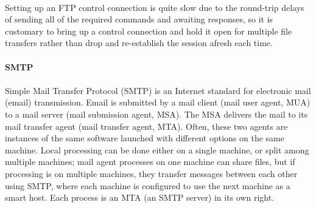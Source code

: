 \paragraph{}
Setting up an FTP control connection is quite slow due to the round-trip delays of sending all of the required commands and awaiting responses, so it is customary to bring up a control connection and hold it open for multiple file transfers rather than drop and re-establish the session afresh each time. 

\paragraph{} \textbf{SMTP}
\paragraph{}
Simple Mail Transfer Protocol (SMTP) is an Internet standard for electronic mail (email) transmission. Email is submitted by a mail client (mail user agent, MUA) to a mail server (mail submission agent, MSA). The MSA delivers the mail to its mail transfer agent (mail transfer agent, MTA). Often, these two agents are instances of the same software launched with different options on the same machine. Local processing can be done either on a single machine, or split among multiple machines; mail agent processes on one machine can share files, but if processing is on multiple machines, they transfer messages between each other using SMTP, where each machine is configured to use the next machine as a smart host. Each process is an MTA (an SMTP server) in its own right.
